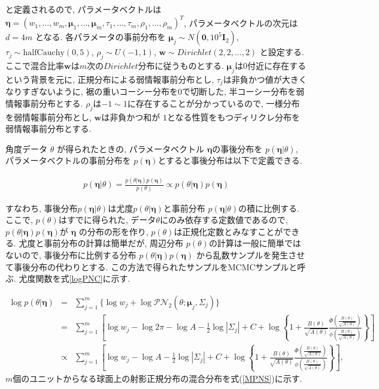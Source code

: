 \documentclass[a4j,12pt]{jarticle}
\begin{document}
\noindent
と定義されるので, パラメータベクトルは$\bm \eta = (w_1, \dots, w_m, \bm \mu_1, \dots, \bm \mu_m, \tau_1, \dots, \tau_m, \rho_1, \dots, \rho_m)^T$, パラメータベクトルの次元は $d = 4m$ となる. 各パラメータの事前分布を $\bm \mu_j \sim N(\bm 0, 10^5 \bm I_2)$, $\tau_j \sim \mathrm{half Cauchy}(0,5)$, $\rho_j \sim U(-1,1)$, $\bm w \sim Dirichlet(2,2, \dots, 2)$ と設定する. ここで混合比率$\bm w$は$m$次の$Dirichlet$分布に従うものとする. $\bm \mu_j$は$0$付近に存在するという背景を元に, 正規分布による弱情報事前分布とし, $\tau_j$は非負かつ値が大きくなりすぎないように, 裾の重いコーシー分布を$0$で切断した, 半コーシー分布を弱情報事前分布とする. $\rho_j$は$-1 \sim 1$に存在することが分かっているので, 一様分布を弱情報事前分布とし, $\bm w$は非負かつ和が $1$となる性質をもつディリクレ分布を弱情報事前分布とする.

角度データ $\theta$ が得られたときの, パラメータベクトル $\bm \eta$の事後分布を $p(\bm \eta| \theta)$, パラメータベクトルの事前分布を $p(\bm \eta)$とすると事後分布は以下で定義できる. 

\begin{eqnarray*}
p(\bm \eta | \theta) = \frac{p(\theta | \bm \eta) p(\bm \eta)}{p(\theta)} \propto p(\theta | \bm \eta) p(\bm \eta)
\end{eqnarray*}

\noindent
すなわち, 事後分布$p(\bm \eta | \theta)$は尤度$p(\theta | \bm \eta)$と事前分布 $p(\bm \eta| \theta)$の積に比例する. ここで, $p(\theta)$はすでに得られた, データ$\theta$にのみ依存する定数値であるので, $p(\theta | \bm \eta) p(\bm \eta)$が $\bm \eta$ の分布の形を作り, $p(\theta)$は正規化定数とみなすことができる. 尤度と事前分布の計算は簡単だが, 周辺分布 $p(\theta)$の計算は一般に簡単ではないので, 事後分布に比例する分布 $p(\theta | \bm \eta) p(\bm \eta)$ から乱数サンプルを発生させて事後分布の代わりとする. この方法で得られたサンプルをMCMCサンプルと呼ぶ. 尤度関数を式\ref{logPNC}に示す. 

\footnotesize
\begin{eqnarray}
\label{logPNC}
\log p(\theta | \bm \eta) &=& \sum^m_{j=1} \{\log w_j + \log \mathcal{PN}_2(\theta;\bm \mu_j, \Sigma_j)\} \nonumber \\ 
&=& \sum^m_{j=1} \left[ \log w_j - \log 2\pi - \log A - \frac{1}{2} \log |\Sigma_j| + C + \log \left\{1 + \frac{B(\theta)}{\sqrt{A(\theta)}} \frac{\Phi \left(\frac{B(\theta)}{\sqrt{A(\theta)}}\right)}{\phi \left(\frac{B(\theta)}{\sqrt{A(\theta)}}\right)}\right\} \right] \nonumber \\
&\propto& \sum^m_{j=1} \left[ \log w_j - \log A - \frac{1}{2} \log |\Sigma_j| + C + \log \left\{1 + \frac{B(\theta)}{\sqrt{A(\theta)}} \frac{\Phi \left(\frac{B(\theta)}{\sqrt{A(\theta)}}\right)}{\phi \left(\frac{B(\theta)}{\sqrt{A(\theta)}}\right)}\right\} \right], 
\end{eqnarray}
\normalsize
\fi
$m$個のユニットからなる球面上の射影正規分布の混合分布を式(\ref{MPNS})に示す. 
\end{document}
